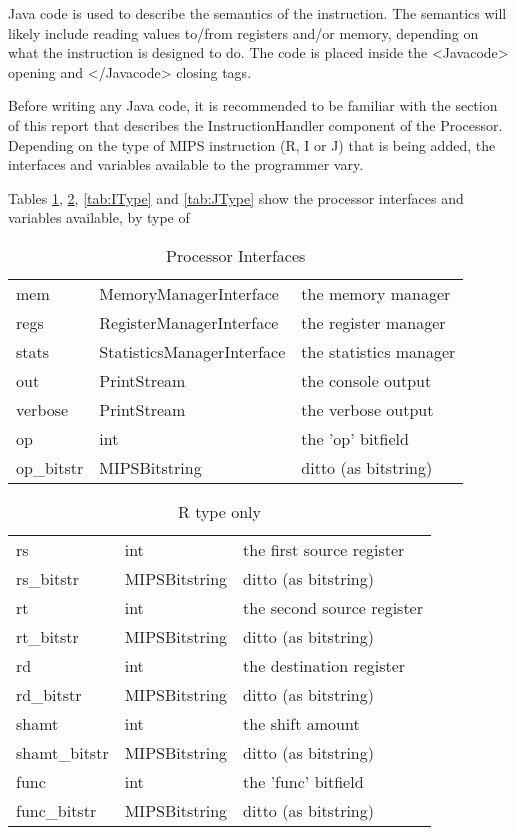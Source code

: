 \begin{enumerate}
Java code is used to describe the semantics of the instruction. The semantics will likely include reading values to/from registers and/or memory, depending on what the instruction is designed to do. The code is placed inside the <Javacode> opening and </Javacode> closing tags.

Before writing any Java code, it is recommended to be familiar with the section of this report that describes the InstructionHandler component of the Processor. Depending on the type of MIPS instruction (R, I or J) that is being added, the interfaces and variables available to the programmer vary. 

Tables \ref{tab:PInterfaces}, \ref{tab:RType}, \ref{tab:IType} and \ref{tab:JType} show the processor interfaces and variables available, by type of 


\begin{table}
\begin{center}
	\begin{tabular}{|l|l|l|}
	\hline
	mem		&	MemoryManagerInterface		&	the memory manager \\
	regs	&	RegisterManagerInterface	&	the register manager \\
	stats	&	StatisticsManagerInterface	&	the statistics manager \\
	out		&	PrintStream					&	the console output \\
	verbose	&	PrintStream					&	the verbose output \\
	op		&	int							&	the 'op' bitfield \\
	op\_bitstr&	MIPSBitstring				&	ditto (as bitstring) \\
	\hline
	\end{tabular}
\caption{Processor Interfaces}
\label{tab:PInterfaces}
\end{center}
\end{table}


\begin{table}
\begin{center}
	\begin{tabular}{|l|l|l|}
	\hline
	rs			&	int				&	the first source register \\
	rs\_bitstr	&	MIPSBitstring	&	ditto (as bitstring) \\
	rt			&	int				&	the second source register \\
	rt\_bitstr	&	MIPSBitstring	&	ditto (as bitstring) \\
	rd			&	int				&	the destination register \\
	rd\_bitstr	&	MIPSBitstring	&	ditto (as bitstring) \\
	shamt		&	int				&	the shift amount \\
	shamt\_bitstr&	MIPSBitstring	&	ditto (as bitstring) \\
	func		&	int				&	the 'func' bitfield \\
	func\_bitstr	&	MIPSBitstring	&	ditto (as bitstring) \\
	\hline
	\end{tabular}
\caption{R type only}
\label{tab:RType}
\end{center}
\end{table}




\end{enumerate}

